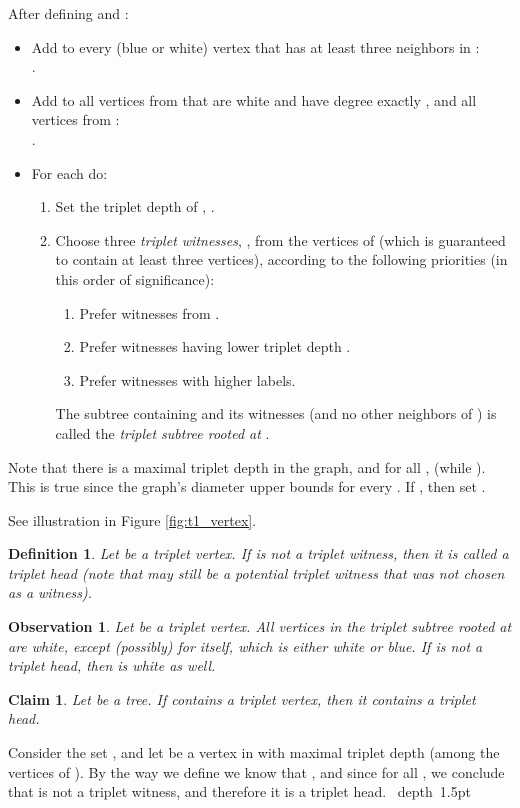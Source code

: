 \documentclass[11pt]{article}
\def\Proof{\par\noindent{\bf Proof:~}}
\def\blackslug{\hbox{\hskip 1pt \vrule width 4pt height 8pt
    depth 1.5pt \hskip 1pt}}
\def\QED{\quad\blackslug\lower 8.5pt\null\par}
\def\dnsitem{\vspace{-7pt}\item}
\def\dnssubitem{\vspace{-5pt}\item}
\newtheorem{definition}[theorem]{Definition}
\newtheorem{claim}[theorem]{Claim}
\newtheorem{observation}[theorem]{Observation}
\theoremstyle{definition}
\begin{document}
\bigskip
\par\noindent
After defining  and :
\begin{itemize}
	\dnsitem Add to  every (blue or white) vertex  that has at least three neighbors in : \\
	.
			
	\dnsitem Add to  all vertices from  that are white and have degree exactly , and all vertices from : \\
	.

	\dnsitem
	For each  do:
	\begin{enumerate}
		\dnsitem Set the triplet depth of , .
		\dnssubitem Choose three \emph{triplet witnesses}, , from the vertices of  (which is guaranteed to contain at least three vertices),
		according to the following priorities (in this order of significance):
		\begin{enumerate}
			\dnssubitem Prefer witnesses from .
			\dnssubitem Prefer witnesses having lower triplet depth .
			\dnssubitem Prefer witnesses with higher  labels.
		\end{enumerate}

		The subtree containing  and its witnesses (and no other neighbors of ) is called the \emph{triplet subtree rooted at }.
	\end{enumerate}

\end{itemize}
Note that there is a maximal triplet depth  in the graph, and for all ,  (while ).
This is true since the graph's diameter upper bounds  for every .
If , then set .

See illustration in Figure \ref{fig:t1_vertex}.

\begin{definition}
Let  be a triplet vertex.
If  is not a triplet witness, then it is called a \emph{triplet head}
(note that  may still be a potential triplet witness that was not chosen as a witness).
\end{definition}

\begin{observation}
\label{obs:triplet_subtrees_white}
Let  be a triplet vertex. 
All vertices in the triplet subtree rooted at  are white, except (possibly) for  itself, which is either white or blue.
If  is not a triplet head, then  is white as well.
\end{observation}



\begin{claim}
\label{claim:triplet_vertex_implies_head}
Let  be a tree. If  contains a triplet vertex, then it contains a triplet head.
\end{claim}
\Proof
Consider the set , and let  be a vertex in  with maximal triplet depth (among the vertices of ).
By the way we define  we know that , 
and since  for all , we conclude that  is not a triplet witness, and therefore it is a triplet head.
\QED
\end{document}
